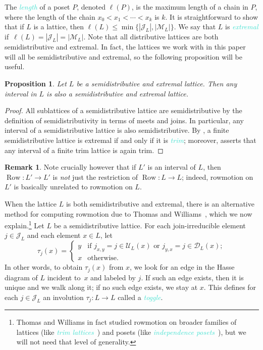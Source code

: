\documentclass[11pt]{amsart}
\DeclareMathOperator{\row}{Row}
\newcommand{\dfn}[1]{\textcolor{Turquoise}{\emph{#1}}}
\newtheorem{proposition}[theorem]{Proposition}
\theoremstyle{definition}
\newtheorem{remark}[theorem]{Remark}
\begin{document}
The \dfn{length} of a poset $P$, denoted $\ell(P)$, is the maximum length of a chain in $P$, where the length of the chain $x_0 < x_1 < \cdots < x_k$ is $k$. It is straightforward to show that if $L$ is a lattice, then $\ell(L)\leq\min\{|\mathcal J_L|,|\mathcal M_L|\}$. We say that $L$ is \dfn{extremal} if~$\ell(L)=|\mathcal J_L|=|\mathcal M_L|$. Note that all distributive lattices are both semidistributive and extremal. In fact, the lattices we work with in this paper will all be semidistributive and extremal, so the following proposition will be useful.

\begin{proposition} \label{prop:intervals}
Let $L$ be a semidistributive and extremal lattice. Then any interval in $L$ is also a semidistributive and extremal lattice.
\end{proposition}

\begin{proof}
All sublattices of a semidistributive lattice are semidistributive by the definition of semidistributivity in terms of meets and joins. In particular, any interval of a semidistributive lattice is also semidistributive. By \cite[Theorem~1.4]{thomas2019rowmotion}, a finite semidistributive lattice is extremal if and only if it is \dfn{trim}; moreover, \cite[Theorem~3.6]{thomas2019rowmotion} asserts that any interval of a finite trim lattice is again trim. 
\end{proof}

\begin{remark}
Note crucially however that if $L'$ is an interval of $L$, then $\row \colon L' \to L'$ is \emph{not} just the restriction of $\row \colon L \to L$; indeed, rowmotion on $L'$ is basically unrelated to rowmotion on $L$.
\end{remark}

When the lattice $L$ is both semidistributive and extremal, there is an alternative method for computing rowmotion due to Thomas and Williams~\cite{thomas2019rowmotion}, which we now explain.\footnote{Thomas and Williams in fact studied rowmotion on broader families of lattices (like \dfn{trim lattices}~\cite{thomas2019rowmotion}) and posets (like \dfn{independence posets}~\cite{thomas2019independence}), but we will not need that level of generality.} Let $L$ be a semidistributive lattice. For each join-irreducible element $j\in \mathcal J_L$ and each element $x\in L$, let 
\[\tau_j(x)=\begin{cases}
    y & \text{if } j_{x,y}=j\in\mathcal U_L(x)\text{ or }j_{y,x}=j\in\mathcal D_L(x); \\
    x & \text{otherwise}.
\end{cases}\]
In other words, to obtain $\tau_j(x)$ from $x$, we look for an edge in the Hasse diagram of $L$ incident to~$x$ and labeled by $j$. If such an edge exists, then it is unique and we walk along it; if no such edge exists, we stay at $x$. This defines for each $j \in \mathcal{J}_L$ an involution $\tau_j\colon L\to L$ called a \dfn{toggle}. 
\end{document}
